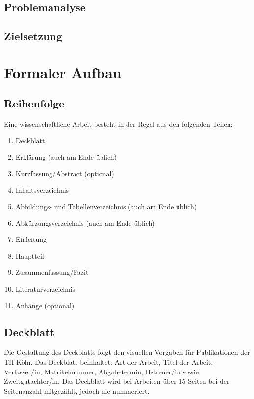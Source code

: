 \documentclass[a4paper,11pt]{article}%
\renewcommand{\\}{\vspace*{0.5\baselineskip} \newline}
\begin{document}
\subsection*{Problemanalyse}
\subsection*{Zielsetzung}

\newpage
\section{Formaler Aufbau}
\subsection{Reihenfolge}
Eine wissenschaftliche Arbeit besteht in der Regel aus den folgenden Teilen:
\begin{enumerate}
	\item Deckblatt
	\item Erklärung (auch am Ende üblich)
	\item Kurzfassung/Abstract (optional)
	\item Inhaltsverzeichnis
	\item Abbildungs- und Tabellenverzeichnis (auch am Ende üblich)
	\item Abkürzungsverzeichnis (auch am Ende üblich)
	\item Einleitung
	\item Hauptteil
	\item Zusammenfassung/Fazit
	\item Literaturverzeichnis
	\item Anhänge (optional)
\end{enumerate}
\subsection{Deckblatt}	
Die Gestaltung des Deckblatts folgt den visuellen Vorgaben für Publikationen der TH Köln.\\
Das Deckblatt beinhaltet: Art der Arbeit, Titel der Arbeit, Verfasser/in, Matrikelnummer, Abgabetermin, Betreuer/in sowie Zweitgutachter/in. Das Deckblatt wird bei Arbeiten über 15 Seiten bei der Seitenanzahl mitgezählt, jedoch nie nummeriert.
\end{document}
